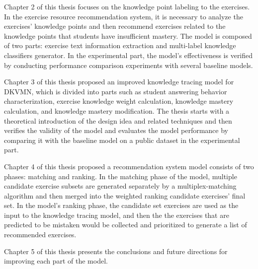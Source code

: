 Chapter 2 of this thesis focuses on the knowledge point labeling to the exercises. In the exercise resource recommendation system, it is necessary to analyze the exercises' knowledge points and then recommend exercises related to the knowledge points that students have insufficient mastery. The model is composed of two parts: exercise text information extraction and multi-label knowledge classifiers generator. In the experimental part, the model's effectiveness is verified by conducting performance comparison experiments with several baseline models.

Chapter 3 of this thesis proposed an improved knowledge tracing model for DKVMN, which is divided into parts such as student answering behavior characterization, exercise knowledge weight calculation, knowledge mastery calculation, and knowledge mastery modification. The thesis starts with a theoretical introduction of the design idea and related techniques and then verifies the validity of the model and evaluates the model performance by comparing it with the baseline model on a public dataset in the experimental part.

Chapter 4 of this thesis proposed a recommendation system model consists of two phases: matching and ranking. In the matching phase of the model, multiple candidate exercise subsets are generated separately by a multiplex-matching algorithm and then merged into the weighted ranking candidate exercises' final set. In the model's ranking phase, the candidate set exercises are used as the input to the knowledge tracing model, and then the the exercises that are predicted to be mistaken would be collected and prioritized to generate a list of recommended exercises.

Chapter 5 of this thesis presents the conclusions and future directions for improving each part of the model.

